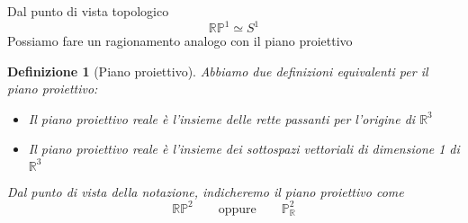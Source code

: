 \documentclass[a4paper]{report}
\newtheorem{definition}{Definizione}
\newcommand{\R}{\ensuremath{\mathbb{R}}}
\newcommand{\RP}[1]{\ensuremath{\mathbb{RP}^{#1}}}
\begin{document}
\begin{center}

\end{center}
Dal punto di vista topologico
\[
    \RP{1}\simeq S^1
\]
Possiamo fare un ragionamento analogo con il piano proiettivo
\begin{definition}[Piano proiettivo]
    Abbiamo due definizioni equivalenti per il piano proiettivo:
    \begin{itemize}
        \item Il piano proiettivo reale è l'insieme delle rette passanti per l'origine di $\R^3$
        \item Il piano proiettivo reale è l'insieme dei sottospazi vettoriali di dimensione 1 di $\R^3$
    \end{itemize}
    Dal punto di vista della notazione, indicheremo il piano proiettivo come
    \[
        \R\mathbb{P}^2\quad\quad\text{oppure}\quad\quad\mathbb{P}_\R^2
    \]
\end{definition}
\end{document}
